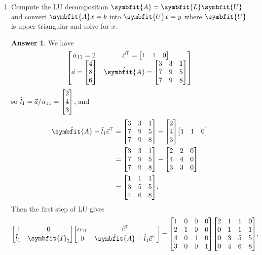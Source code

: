 \documentclass{article}
\theoremstyle{definition}
\newtheorem*{answer}{Answer}
\newcommand{\mat}[1]{\symbfit{#1}}
\begin{document}
\begin{enumerate}[leftmargin=\labelsep]
\begin{enumerate}
		      \item Compute the LU decomposition \(\mat{A} = \mat{L}\mat{U}\) and convert \(\mat{A}x = b\) into \(\mat{U}x = y\) where \(\mat{U}\) is upper triangular and solve for \(x\).
		            \begin{answer}
			            We have
			            \begin{align*}
				            \begin{bmatrix}
					            \alpha_{11}=2 & \vec{c}^{\top} = \mqty[1 & 1 & 0] \\
					            \displaystyle \vec{a} = \mqty[4                   \\8\\6] & \hat{\mat{A}} = \mqty[3&3&1\\7&9&5\\7&9&8]
				            \end{bmatrix}
			            \end{align*}
			            so \(\hat{l}_1 = \vec{a}/\alpha_{11} = \mqty[2\\4\\3]\), and
			            \begin{align*}
				            \hat{\mat{A}}-\hat{l}_1 \vec{c}^{\top} & = \mqty[3 & 3 & 1 \\7&9&5\\7&9&8]-\mqty[2\\4\\3]\mqty[1&1&0] \\
				                                                   & = \mqty[3 & 3 & 1 \\7&9&5\\7&9&8]-\mqty[2&2&0\\4&4&0\\3&3&0] \\
				                                                   & = \mqty[1 & 1 & 1 \\3&5&5\\4&6&8].
			            \end{align*}
			            Then the first step of LU gives
			            \begin{equation}
				            \mqty[1&0\\\hat{l}_1 &\mat{I}_{3}]\mqty[\alpha_{11} & \vec{c}^{\top}\\0 &\hat{\mat{A}}-\hat{l}_1\vec{c}^{\top}] = \mqty[1&0&0&0\\2&1&0&0\\4&0&1&0\\3&0&0&1] \mqty[2&1&1&0\\0&1&1&1\\0&3&5&5\\0&4&6&8] \label{eq:LU1}.

\end{equation}
\end{answer}
\end{enumerate}
\end{enumerate}
\end{document}
